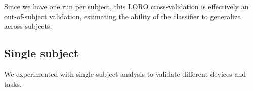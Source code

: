         Since we have one run per subject, this LORO cross-validation is effectively an out-of-subject validation, estimating the ability of the classifier to generalize across subjects.

    \subsection{Single subject}

        We experimented with single-subject analysis to validate different devices and tasks.
